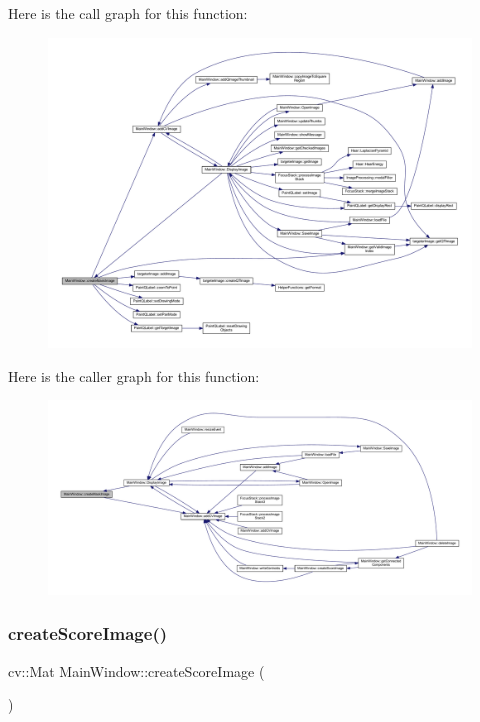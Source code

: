 Here is the call graph for this function\+:
\nopagebreak
\begin{figure}[H]
\begin{center}
\leavevmode
\includegraphics[width=350pt]{class_main_window_a92a40847027eaf2cf258c3a9f8da4c48_cgraph}
\end{center}
\end{figure}
Here is the caller graph for this function\+:
\nopagebreak
\begin{figure}[H]
\begin{center}
\leavevmode
\includegraphics[width=350pt]{class_main_window_a92a40847027eaf2cf258c3a9f8da4c48_icgraph}
\end{center}
\end{figure}
\mbox{\label{class_main_window_a8d87cd33d22ce614c9d7945264588e5f}} 
\subsubsection{\texorpdfstring{create\+Score\+Image()}{createScoreImage()}}
{\footnotesize\ttfamily cv\+::\+Mat Main\+Window\+::create\+Score\+Image (\begin{DoxyParamCaption}{ }\end{DoxyParamCaption})}

